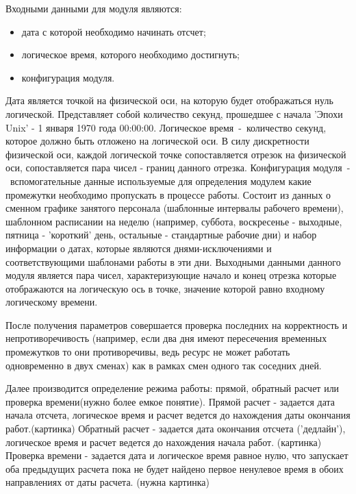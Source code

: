 Входными данными для модуля являются:
\begin{itemize}
	\item дата с которой необходимо начинать отсчет;
	\item логическое время, которого необходимо достигнуть;
	\item конфигурация модуля.
\end{itemize}
Дата является точкой на физической оси, на которую будет отображаться нуль логической. Представляет собой количество секунд, прошедшее с начала 'Эпохи Unix' - 1 января 1970 года 00:00:00.
Логическое время~-~количество секунд, которое должно быть отложено на логической оси. В силу дискретности физической оси, каждой логической точке сопоставляется отрезок на физической оси, сопоставляется пара чисел - границ данного отрезка.
Конфигурация модуля~-~вспомогательные данные используемые для определения модулем какие промежутки необходимо пропускать в процессе работы. Состоит из данных о сменном графике занятого персонала (шаблонные интервалы рабочего времени), шаблонном расписании на неделю (например, суббота, воскресенье - выходные, пятница - 'короткий' день, остальные - стандартные рабочие дни) и набор информации о датах, которые являются днями-исключениями и соответствующими шаблонами работы в эти дни.
\newline
Выходными данными данного модуля является пара чисел, характеризующие начало и конец отрезка которые отображаются на логическую ось в точке, значение которой равно входному логическому времени.

После получения параметров совершается проверка последних на корректность и непротиворечивость (например, если два дня имеют пересечения временных промежутков то они противоречивы, ведь ресурс не может работать одновременно в двух сменах) как в рамках смен одного так соседних дней.

Далее производится определение режима работы: прямой, обратный расчет или проверка времени(нужно более емкое понятие).
Прямой расчет - задается дата начала отсчета, логическое время и расчет ведется до нахождения даты окончания работ.(картинка)
Обратный расчет - задается дата окончания отсчета ('дедлайн'), логическое время и расчет ведется до нахождения начала работ. (картинка)
Проверка времени - задается дата и логическое время равное нулю, что запускает оба предыдущих расчета пока не будет найдено первое ненулевое время в обоих направлениях от даты расчета. (нужна картинка)

